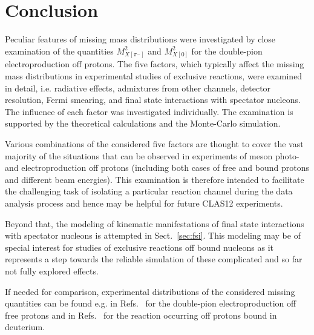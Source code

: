 \newpage
\chapter{Conclusion}
\mbox{}\vspace{-\baselineskip}

Peculiar features of missing mass distributions were investigated by close examination of the quantities $M^{2}_{X[\pi^{-}]}$ and $M^{2}_{X[0]}$ for the double-pion electroproduction off protons. The five factors, which typically affect the missing mass distributions in experimental studies of exclusive reactions, were examined in detail, i.e. radiative effects, admixtures from other channels, detector resolution, Fermi smearing, and final state interactions with spectator nucleons. The influence of each factor was investigated individually. The examination is supported by the theoretical calculations and the Monte-Carlo simulation.

Various combinations of the considered five factors are thought to cover the vast majority of the situations that can be observed in experiments of meson photo- and electroproduction off protons (including both cases of free and bound protons and different beam energies). This examination is therefore intended to facilitate the challenging task of isolating a particular reaction channel during the data analysis process and hence may be helpful for future CLAS12 experiments.


Beyond that, the modeling of kinematic manifestations of final state interactions with spectator nucleons is attempted in Sect.~\ref{sec:fsi}. This modeling may be of special interest for studies of exclusive reactions off bound nucleons as it represents a step towards the reliable simulation of these complicated and so far not fully explored effects.

If needed for comparison, experimental distributions of the considered missing quantities can be found e.g. in Refs.~\cite{Fed_an_note:2017,Fed_paper_2018,Arjun} for the double-pion electroproduction off free protons and in Refs.~\cite{Skorodumina:2015rea,skorodum_an_note:2019} for the reaction occurring off protons bound in deuterium.


